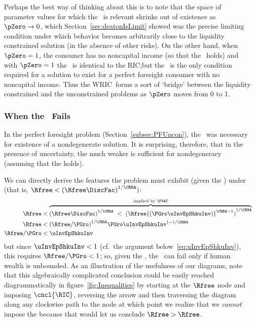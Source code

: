 \documentclass[BufferStockTheory]{subfiles}
\begin{document}
Perhaps the best way of thinking about this is to note that the space of parameter values for which the \WRIC~is relevant shrinks out of existence as $\pZero \rightarrow 0$, which Section~\ref{sec:deatonIsLimit} showed was the precise limiting condition under which behavior becomes arbitrarily close to the liquidity constrained solution (in the absence of other risks).  On the other hand, when $\pZero = 1$, the consumer has no noncapital income (so that the \FHWC~holds) and with $\pZero=1$ the \WRIC~is identical to the RIC;\@ but the \RIC~is the only condition required for a solution to exist for a perfect foresight consumer with no noncapital income.  Thus the WRIC~forms a sort of `bridge' between the liquidity constrained and the unconstrained problems as $\pZero$ moves from 0 to 1.

\hypertarget{IntuitionRIC}{}
\subsubsection{When the \RIC~Fails}\label{subsubsec:WhenTheRICFails}

In the perfect foresight problem (Section~\ref{subsec:PFUncon}), the \RIC~was necessary for existence of a nondegenerate solution.  It is surprising, therefore, that in the presence of uncertainty, the much weaker {\WRIC} is sufficient for nondegeneracy (assuming that the {\FVAC} holds).
\begin{comment}
  But if the \RIC~does hold, some useful results can be derived.  Arguably
  the most fundamental are that the limiting values
  for the minimal and maximal marginal propensities to consume implicit in
  ~\eqref{eq:MaxMPCInv} and~\eqref{eq:MinMPCInv} are positive and finite.
\end{comment}
We can directly derive the features the problem must
exhibit (given the \FVAC) under \cncl{\RIC} (that is, $\Rfree < {(\Rfree \DiscFac)}^{1/\CRRA})$:
\begin{equation}\label{eq:RICimplies}
  \begin{split}
    \Rfree   & < \overbrace{{(\Rfree \DiscFac)}^{1/\CRRA} ~ < ~ {(\Rfree {(\PGro \uInvEpShkuInv)}^{\CRRA-1})}^{1/\CRRA}}^{\text{implied by \FVAC}} 
    \\  \Rfree   & < {(\Rfree/\PGro)}^{1/\CRRA}\PGro \uInvEpShkuInv^{1-1/\CRRA} 
    \\  \Rfree/\PGro  & < \uInvEpShkuInv 
  \end{split}
\end{equation}
but since $\uInvEpShkuInv < 1$ (cf.\ the argument below~\eqref{eq:uInvEpShkuInv}), this requires $\Rfree/\PGro < 1$; so, given the \FVAC, the \RIC~can fail only if human wealth is unbounded.  As an illustration of the usefulness of our diagrams, note that this algebraically complicated conclusion could be easily reached diagrammatically in figure~\ref{fig:Inequalities} by starting at the $\Rfree$ node and imposing $\cncl{\RIC}$, reversing the {\RIC} arrow and then traversing the diagram along any clockwise path to the {\PFVAF} node at which point we realize that we \textit{cannot} impose the {\FHWC} because that would let us conclude $\Rfree > \Rfree$.
\end{document}
